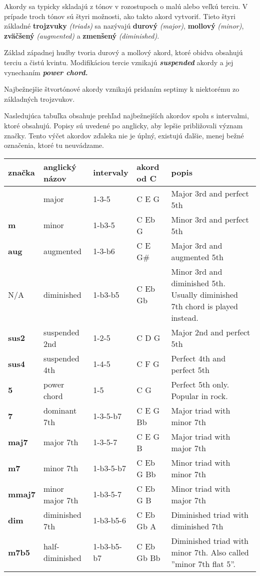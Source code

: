 Akordy sa typicky skladajú z tónov v rozostupoch o malú alebo veľkú terciu. V prípade troch tónov sú štyri možnosti,
ako takto akord vytvoriť. Tieto štyri základné \textbf{trojzvuky} \textit{(triads)} sa nazývajú
\textbf{durový} \textit{(major)}, \textbf{mollový} \textit{(minor)}, \textbf{zväčšený} \textit{(augmented)}
a \textbf{zmenšený} \textit{(diminished)}.

Základ západnej hudby tvoria durový a mollový akord, ktoré obidva obsahujú terciu a čistú kvintu. Modifikáciou
tercie vznikajú \textbf{\textit{suspended}} akordy a jej vynechaním \textbf{\textit{power chord.}}

Najbežnejšie štvortónové akordy vznikajú pridaním septimy k niektorému zo základných trojzvukov.

Nasledujúca tabuľka obsahuje prehľad najbežnejších akordov spolu s intervalmi, ktoré obsahujú.
Popisy sú uvedené po anglicky, aby lepšie približovali význam značky. Tento výčet akordov zďaleka
nie je úplný, existujú ďalšie, menej bežné označenia, ktoré tu neuvádzame.

{\smaller
\begin{tabularx}{\linewidth}{ l l l l X }
    značka & anglický názov & intervaly & akord od C & popis \\
    \hline
      & major & 1-3-5 & C E G & Major 3rd and perfect 5th \\
    \textbf{m} & minor & 1-b3-5 & C Eb G & Minor 3rd and perfect 5th \\
    \textbf{aug} & augmented & 1-3-b6 & C E G\# & Major 3rd and augmented 5th \\
    N/A & diminished & 1-b3-b5 & C Eb Gb & Minor 3rd and diminished 5th. Usually diminished 7th chord is played instead. \\
    \hline
    \textbf{sus2} & suspended 2nd & 1-2-5 & C D G & Major 2nd and perfect 5th  \\
    \textbf{sus4} & suspended 4th & 1-4-5 & C F G & Perfect 4th and perfect 5th \\
    \textbf{5} & power chord & 1-5 & C G & Perfect 5th only. Popular in rock. \\
    \hline
    \textbf{7} & dominant 7th &  1-3-5-b7 & C E G Bb & Major triad with minor 7th  \\
    \textbf{maj7} & major 7th &  1-3-5-7 & C E G B & Major triad with major 7th \\
    \textbf{m7} & minor 7th &  1-b3-5-b7 & C Eb G Bb & Minor triad with minor 7th \\
    \textbf{mmaj7} & minor major 7th &  1-b3-5-7 & C Eb G B & Minor triad with major 7th \\
    \textbf{dim} & diminished 7th &  1-b3-b5-6 & C Eb Gb A & Diminished triad with diminished 7th \\
    \textbf{m7b5} & half-diminished &  1-b3-b5-b7 & C Eb Gb Bb & Diminished triad with minor 7th. Also called ''minor 7th flat 5''. \\
\end{tabularx}
}

